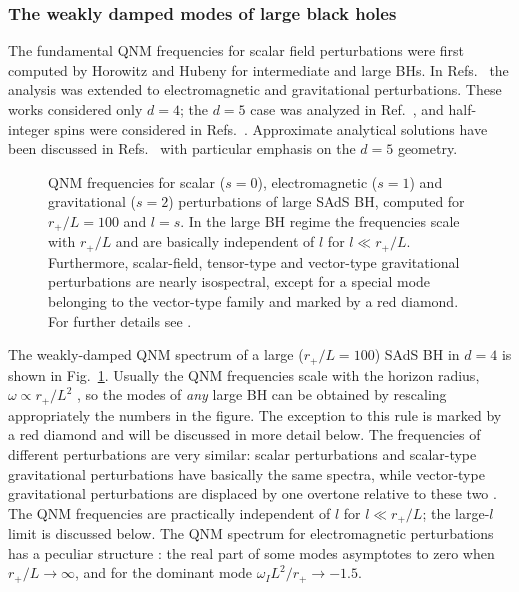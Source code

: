 \documentclass[]{iopart}
\begin{document}
\subsubsection*{The weakly damped modes of large black holes}

The fundamental QNM frequencies for scalar field perturbations were first
computed by Horowitz and Hubeny \cite{Horowitz:1999jd} for intermediate and
large BHs. In Refs.~\cite{Cardoso:2001bb,Cardoso:2003cj} the analysis was
extended to electromagnetic and gravitational perturbations. These works
considered only $d=4$; the $d=5$ case was analyzed in
Ref.~\cite{Friess:2006kw}, and half-integer spins were considered in
Refs.~\cite{Giammatteo:2004wp,Jing:2005ux}. Approximate analytical solutions
have been discussed in Refs.~\cite{Musiri:2003rv,Musiri:2003rs,Musiri:2005ev}
with particular emphasis on the $d=5$ geometry.

\begin{figure}[ht]
\begin{center}
\caption{QNM frequencies for scalar ($s=0$), electromagnetic ($s=1$) and
  gravitational ($s=2$) perturbations of large SAdS BH, computed for
  $r_+/L=100$ and $l=s$. In the large BH regime the frequencies scale with
  $r_+/L$ and are basically independent of $l$ for $l \ll r_+/L$. Furthermore,
  scalar-field, tensor-type and vector-type gravitational perturbations are
  nearly isospectral, except for a special mode belonging to the vector-type
  family and marked by a red diamond. For further details see
  \cite{Cardoso:2003cj,Berti:2003ud}.\label{fig:sads}}
\end{center}
\end{figure}
%
The weakly-damped QNM spectrum of a large ($r_+/L=100$) SAdS BH in $d=4$ is
shown in Fig.~\ref{fig:sads}. Usually the QNM frequencies scale with the
horizon radius, $\omega \propto r_+/L^2$
\cite{Horowitz:1999jd,Cardoso:2003cj}, so the modes of {\em any} large BH can
be obtained by rescaling appropriately the numbers in the figure. The
exception to this rule is marked by a red diamond and will be discussed in
more detail below.  The frequencies of different perturbations are very
similar: scalar perturbations and scalar-type gravitational perturbations have
basically the same spectra, while vector-type gravitational perturbations are
displaced by one overtone relative to these two \cite{Cardoso:2003cj}.
%
The QNM frequencies are practically independent of $l$ for $l \ll r_+/L$; the
large-$l$ limit is discussed below. The QNM spectrum for electromagnetic
perturbations has a peculiar structure
\cite{Cardoso:2001bb,Berti:2003ud,Cardoso:2003cj,Miranda:2008vb,Myung:2008pr}:
the real part of some modes asymptotes to zero when $r_+/L \to \infty$, and for
the dominant mode $\omega_I L^2/r_+ \to -1.5$.
\end{document}
